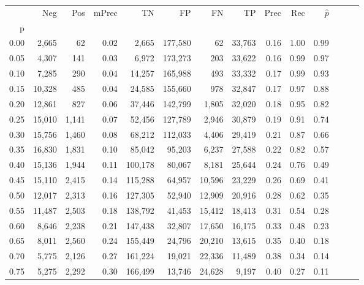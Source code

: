 \begin{tabular}{rrrrrrrrrrrrrr}
\toprule
{} &     Neg &    Pos & mPrec &       TN &       FP &      FN &      TP &  Prec &   Rec & $\hat{p}$ \\
p    &         &        &       &          &          &         &         &       &       &           \\
\midrule
0.00 &   2,665 &     62 &  0.02 &    2,665 &  177,580 &      62 &  33,763 &  0.16 &  1.00 &      0.99 \\
0.05 &   4,307 &    141 &  0.03 &    6,972 &  173,273 &     203 &  33,622 &  0.16 &  0.99 &      0.97 \\
0.10 &   7,285 &    290 &  0.04 &   14,257 &  165,988 &     493 &  33,332 &  0.17 &  0.99 &      0.93 \\
0.15 &  10,328 &    485 &  0.04 &   24,585 &  155,660 &     978 &  32,847 &  0.17 &  0.97 &      0.88 \\
0.20 &  12,861 &    827 &  0.06 &   37,446 &  142,799 &   1,805 &  32,020 &  0.18 &  0.95 &      0.82 \\
0.25 &  15,010 &  1,141 &  0.07 &   52,456 &  127,789 &   2,946 &  30,879 &  0.19 &  0.91 &      0.74 \\
0.30 &  15,756 &  1,460 &  0.08 &   68,212 &  112,033 &   4,406 &  29,419 &  0.21 &  0.87 &      0.66 \\
0.35 &  16,830 &  1,831 &  0.10 &   85,042 &   95,203 &   6,237 &  27,588 &  0.22 &  0.82 &      0.57 \\
0.40 &  15,136 &  1,944 &  0.11 &  100,178 &   80,067 &   8,181 &  25,644 &  0.24 &  0.76 &      0.49 \\
0.45 &  15,110 &  2,415 &  0.14 &  115,288 &   64,957 &  10,596 &  23,229 &  0.26 &  0.69 &      0.41 \\
0.50 &  12,017 &  2,313 &  0.16 &  127,305 &   52,940 &  12,909 &  20,916 &  0.28 &  0.62 &      0.35 \\
0.55 &  11,487 &  2,503 &  0.18 &  138,792 &   41,453 &  15,412 &  18,413 &  0.31 &  0.54 &      0.28 \\
0.60 &   8,646 &  2,238 &  0.21 &  147,438 &   32,807 &  17,650 &  16,175 &  0.33 &  0.48 &      0.23 \\
0.65 &   8,011 &  2,560 &  0.24 &  155,449 &   24,796 &  20,210 &  13,615 &  0.35 &  0.40 &      0.18 \\
0.70 &   5,775 &  2,126 &  0.27 &  161,224 &   19,021 &  22,336 &  11,489 &  0.38 &  0.34 &      0.14 \\
0.75 &   5,275 &  2,292 &  0.30 &  166,499 &   13,746 &  24,628 &   9,197 &  0.40 &  0.27 &      0.11 \\

\end{tabular}
